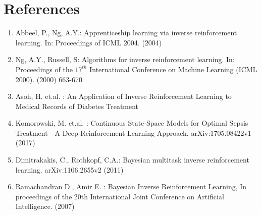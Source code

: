 \documentclass[twoside,11pt]{article}
\begin{document}


\section*{References}
\begin{enumerate}
\item Abbeel, P., Ng, A.Y.: Apprenticeship learning via inverse reinforcement learning. In: Proceedings of ICML 2004. (2004)
\item Ng, A.Y., Russell, S: Algorithms for inverse reinforcement learning. In: Proceedings of the $17^{th}$ International Conference on Machine Learning (ICML 2000). (2000) 663-670
\item Asoh, H. et.al. : An Application of Inverse Reinforcement Learning to Medical Records of Diabetes Treatment
\item Komorowski, M. et.al. : Continuous State-Space Models for Optimal Sepsis Treatment - A Deep
Reinforcement Learning Approach. arXiv:1705.08422v1 (2017)
\item Dimitrakakis, C., Rothkopf, C.A.: Bayesian multitask inverse reinforcement learning. arXiv:1106.2655v2 (2011)
\item Ramachandran D., Amir E. : Bayesian Inverse Reinforcement Learning, In proceedings of the 20th International Joint Conference on Artificial Intelligence. (2007)
\end{enumerate}
\end{document}
